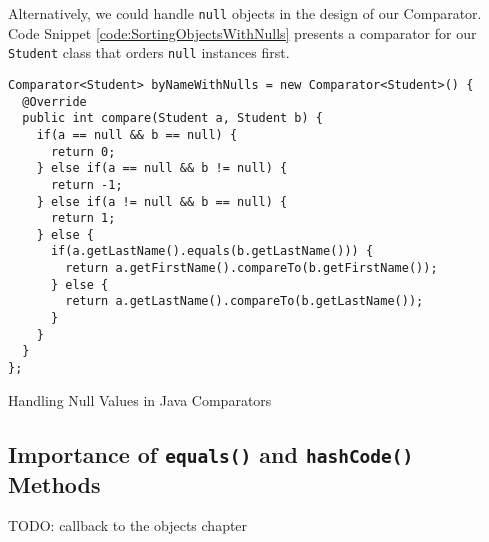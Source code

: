 Alternatively, we could handle \texttt{null} objects in the design of our Comparator.  Code
Snippet \ref{code:SortingObjectsWithNulls} presents a comparator for our \texttt{Student} class that orders \texttt{null}
instances first.

\begin{listing}[H]
\begin{verbatim}
Comparator<Student> byNameWithNulls = new Comparator<Student>() {
  @Override
  public int compare(Student a, Student b) {
    if(a == null && b == null) {
      return 0;
    } else if(a == null && b != null) {
      return -1;
    } else if(a != null && b == null) {
      return 1;
    } else {
      if(a.getLastName().equals(b.getLastName())) {
        return a.getFirstName().compareTo(b.getFirstName());
      } else {
        return a.getLastName().compareTo(b.getLastName());
      }
    }
  }
};
\end{verbatim}
\caption{Handling Null Values in Java Comparators}
\label{code:SortingObjectsWithNulls}
\end{listing}

\subsection{Importance of \texttt{equals()} and \texttt{hashCode()} Methods}

TODO: callback to the objects chapter

